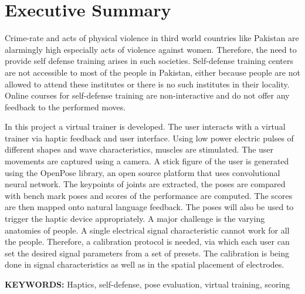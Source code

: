 \chapter*{Executive Summary}
Crime-rate and acts of physical violence in third world countries like Pakistan are alarmingly high especially acts of violence against women. Therefore, the need to provide self defense training arises in such societies. Self-defense training centers are not accessible to most of the people in Pakistan, either because people are not allowed to attend these institutes or there is no such institutes in their locality. Online courses for self-defense training are non-interactive and do not offer any feedback to the performed moves.


In this project a virtual trainer is developed. The user interacts with a virtual trainer via haptic feedback and user interface. Using low power electric pulses of different shapes and wave characteristics, muscles are stimulated. The user movements are captured using a camera. A stick figure of the user is generated using the OpenPose library, an open source platform that uses convolutional neural network. The keypoints of joints are extracted, the poses are compared with bench mark poses and scores of the performance are computed. The scores are then mapped onto natural language feedback. The poses will also be used to trigger the haptic device appropriately. A major challenge is the varying anatomies of people. A single electrical signal characteristic cannot work for all the people. Therefore, a calibration protocol is needed, via which each user can set the desired signal parameters from a set of presets. The calibration is being done in signal characteristics as well as in the spatial placement of electrodes.

\begin{flushleft}
\textbf{KEYWORDS:} Haptics, self-defense, pose evaluation, virtual training, scoring
\end{flushleft}